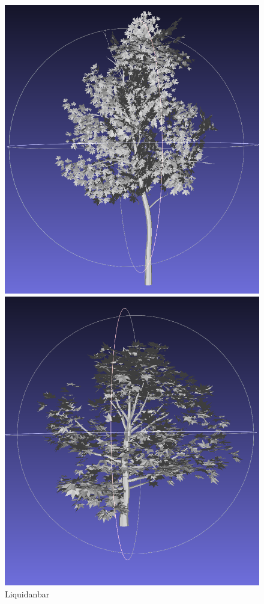 \documentclass[12pt]{article}
\begin{document}
\begin{figure}[H]
\begin{minipage}{0.24\textwidth}
        \includegraphics[width=\textwidth]{images/liquidanbar.png}
        \caption{Liquidanbar}
    \end{minipage}\hfill
    \begin{minipage}{0.24\textwidth}
        \centering
        \includegraphics[width=\textwidth]{images/platanus.png}

\end{minipage}
\end{figure}
\end{document}
